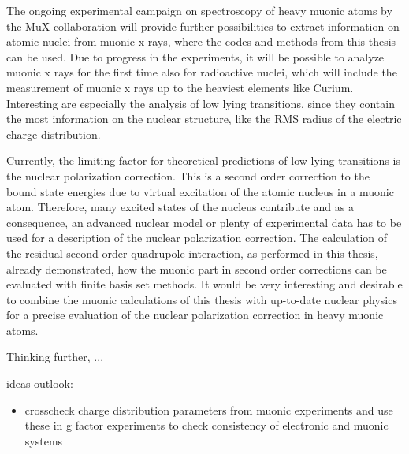 The ongoing experimental campaign on spectroscopy of heavy muonic atoms by the MuX collaboration will provide further possibilities to extract information on atomic nuclei from muonic x rays, where the codes and methods from this thesis can be used. 
Due to progress in the experiments, it will be possible to analyze muonic x rays for the first time also for radioactive nuclei, which will include the measurement of muonic x rays up to the heaviest elements like Curium.
Interesting are especially the analysis of low lying transitions, since they contain the most information on the nuclear structure, like the RMS radius of the electric charge distribution.

Currently, the limiting factor for theoretical predictions of low-lying transitions is the nuclear polarization correction. This is a second order correction to the bound state energies due to virtual excitation of the atomic nucleus in a muonic atom. Therefore, many excited states of the nucleus contribute and as a consequence, an advanced nuclear model or plenty of experimental data has to be used for a description of the nuclear polarization correction.
The calculation of the residual second order quadrupole interaction, as performed in this thesis, already demonstrated, how the muonic part in second order corrections can be evaluated with finite basis set methods. It would be very interesting and desirable to combine the muonic calculations of this thesis with up-to-date nuclear physics for a precise evaluation of the nuclear polarization correction in heavy muonic atoms.

Thinking further, ...


\clearpage
ideas outlook:
\begin{itemize}
\item crosscheck charge distribution parameters from muonic experiments and use these in g factor experiments to check consistency of electronic and muonic systems
\end{itemize}
 






